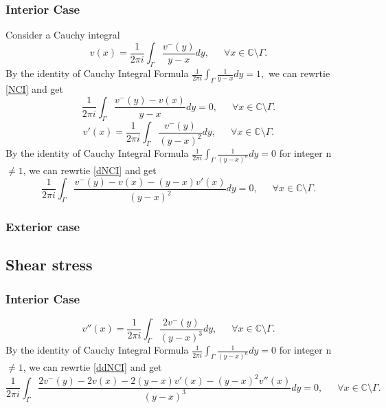 \documentclass[preprint, 10pt]{elsarticle}
\newcommand{\Cdb}{\mbox{$\mathbb{C}$}}
\begin{document}
\subsubsection{Interior Case}
Consider a Cauchy integral 
\begin{equation}\label{NCI}
v({x})=\frac{1}{2\pi i}\int_{\Gamma}\frac{v^-({ y})}{{ y}-{ x}} d{ y},\,\,\,\,\,\,\,\,\, \forall { x} \in \Cdb\setminus \Gamma.
\end{equation}
By the identity of Cauchy Integral Formula $\displaystyle\frac{1}{2 \pi i}\int_{\Gamma}\frac{1}{{ y}-{ x}} d{ y}=1,$ we can rewrtie \eqref{NCI} and get 
\begin{equation}
\frac{1}{2\pi i}\int_{\Gamma}\frac{v^-({ y})-v(x)}{{ y}-{ x}} d{ y}=0,\,\,\,\,\,\,\,\,\, \forall { x} \in \Cdb\setminus \Gamma.
\end{equation}
\begin{equation}\label{dNCI}
v'({x})=\frac{1}{2\pi i}\int_{\Gamma}\frac{v^-({ y})}{(y- x)^2} d{ y},\,\,\,\,\,\,\,\,\, \forall { x} \in \Cdb\setminus \Gamma.
\end{equation}
By the identity of Cauchy Integral Formula $\displaystyle\frac{1}{2 \pi i}\int_{\Gamma}\frac{1}{( y- x)^n} d{ y}=0$ for integer n $\neq 1$, we can rewrtie \eqref{dNCI} and get 
\begin{equation}
\frac{1}{2\pi i}\int_{\Gamma}\frac{v^-({ y})-v(x)-(y-x)v'(x)}{(y-x)^2} d{ y}=0,\,\,\,\,\,\,\,\,\, \forall { x} \in \Cdb\setminus \Gamma.
\end{equation}

\subsubsection{Exterior case}
 
\subsection{Shear stress}
\label{sec:shearStress}
\subsubsection{Interior Case}
\begin{equation}\label{ddNCI}
v''({x})=\frac{1}{2\pi i}\int_{\Gamma}\frac{2v^-({ y})}{(y- x)^3} d{ y},\,\,\,\,\,\,\,\,\, \forall { x} \in \Cdb\setminus \Gamma.
\end{equation}
By the identity of Cauchy Integral Formula $\displaystyle\frac{1}{2 \pi i}\int_{\Gamma}\frac{1}{( y- x)^n} d{ y}=0$ for integer n $\neq 1$, we can rewrtie \eqref{ddNCI} and get 
\begin{equation}
\frac{1}{2\pi i}\int_{\Gamma}\frac{2v^-({ y})-2v(x)-2(y-x)v'(x)-(y-x)^2v''(x)}{(y-x)^3} d{ y}=0,\,\,\,\,\,\,\,\,\, \forall { x} \in \Cdb\setminus \Gamma.
\end{equation}
\end{document}
